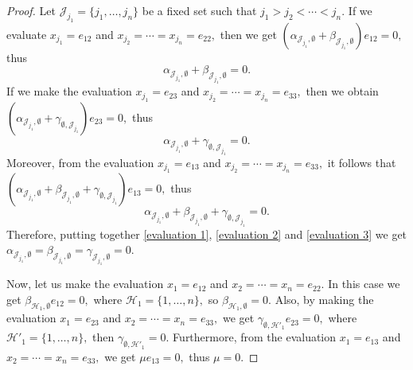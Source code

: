 \documentclass[a4paper,reqno]{amsart}
\theoremstyle{definition}
\numberwithin{equation}{section}
\numberwithin{theorem}{section}
\begin{document}
\begin{proof}
Let $\mathcal{J}_{j_1}=\{j_1,\ldots,j_n\}$ be a fixed set such that $j_1>j_2<  \cdots < j_n.$ If we evaluate $ x_{j_1}= e_{12}$ and  $x_{j_2}=\cdots = x_{j_n}= e_{22},$ then we get $(\alpha_{ \mathcal{J}_{j_1}, \emptyset} +\beta_{ \mathcal{J}_{j_1}, \emptyset}) e_{12}=0,$ thus 
\begin{equation}\label{evaluation 1}
    \alpha_{ \mathcal{J}_{j_1}, \emptyset} +\beta_{ \mathcal{J}_{j_1}, \emptyset}=0.
\end{equation}
If we make the evaluation $ x_{j_1}= e_{23}$ and  $x_{j_2}=\cdots = x_{j_n}= e_{33},$ then we obtain $(\alpha_{ \mathcal{J}_{j_1}, \emptyset} +\gamma_{ \emptyset, \mathcal{J}_{j_1}}) e_{23}=0,$ thus 
\begin{equation}\label{evaluation 2}
    \alpha_{ \mathcal{J}_{j_1}, \emptyset} +\gamma_{ \emptyset, \mathcal{J}_{j_1}}=0.
\end{equation}
 Moreover, from the evaluation $ x_{j_1}= e_{13}$ and  $x_{j_2}=\cdots = x_{j_n}= e_{33},$ it follows that $(\alpha_{ \mathcal{J}_{j_1}, \emptyset} +\beta_{ \mathcal{J}_{j_1}, \emptyset}+ \gamma_{ \emptyset, \mathcal{J}_{j_1}}) e_{13}=0,$ thus 
 \begin{equation}\label{evaluation 3}
    \alpha_{ \mathcal{J}_{j_1}, \emptyset} +\beta_{ \mathcal{J}_{j_1}, \emptyset}+ \gamma_{ \emptyset, \mathcal{J}_{j_1}}=0.
 \end{equation}
Therefore, putting  together \eqref{evaluation 1}, \eqref{evaluation 2} and \eqref{evaluation 3} we get 
$\alpha_{ \mathcal{J}_{j_1}, \emptyset} =\beta_{ \mathcal{J}_{j_1}, \emptyset}= \gamma_{ \mathcal{J}_{j_1}, \emptyset}=0.$

Now, let us make the evaluation $ x_{1}= e_{12}$ and  $x_{2}=\cdots = x_{n}= e_{22}.$ In this case we get $\beta_{ \mathcal{H}_{1}, \emptyset}  e_{12}=0,$ where $\mathcal{H}_{1}=\{1,\ldots,n\},$ so  $\beta_{ \mathcal{H}_{1}, \emptyset}=0.$ Also, by making the evaluation  $ x_{1}= e_{23}$ and  $x_{2}=\cdots = x_{n}= e_{33},$ we get $\gamma_{  \emptyset, \mathcal{H}'_{1}}  e_{23}=0,$ where $\mathcal{H}'_{1}=\{1,\ldots,n\},$ then  $\gamma_{  \emptyset, \mathcal{H}'_{1}}=0.$ Furthermore, from the evaluation $ x_{1}= e_{13}$ and  $x_{2}=\cdots = x_{n}= e_{33},$ we get $\mu  e_{13}=0,$ thus  $\mu=0.$ 


\end{proof}
\end{document}
